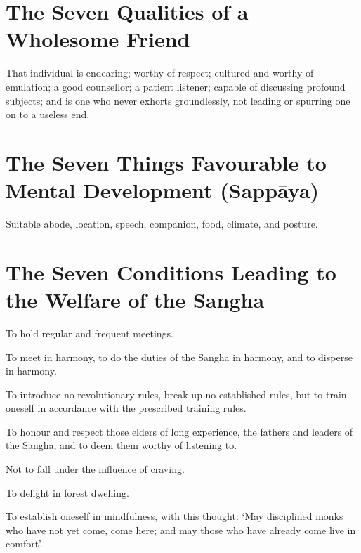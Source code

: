 \ifhandbookedition
\vspace*{-\baselineskip}
\fi

\section*{The Seven Qualities of a Wholesome Friend}


That individual is endearing; worthy of respect; cultured and worthy of
emulation; a good counsellor; a patient listener; capable of discussing profound
subjects; and is one who never exhorts groundlessly, not leading or spurring one
on to a useless end.


\ifhandbookedition
\vspace*{-\baselineskip}
\fi

\section*{The Seven Things Favourable to Mental Development (Sappāya)}


Suitable abode, location, speech, companion, food, climate, and posture.


\ifhandbookedition
\vspace*{-\baselineskip}
\fi

\section*{The Seven Conditions Leading to the Welfare of the Sangha}

To hold regular and frequent meetings.

To meet in harmony, to do the duties of the Sangha in harmony, and to disperse
in harmony.

To introduce no revolutionary rules, break up no established rules, but
to train oneself in accordance with the prescribed training rules.

To honour and respect those elders of long experience, the fathers and leaders
of the Sangha, and to deem them worthy of listening to.

Not to fall under the influence of craving.

To delight in forest dwelling.

To establish oneself in mindfulness, with this thought: ‘May disciplined monks
who have not yet come, come here; and may those who have already come live in
comfort’.


